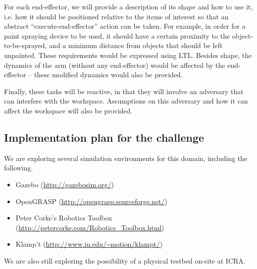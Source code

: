 \documentclass{amsart}
\theoremstyle{definition}
\begin{document}
For each end-effector, we will provide a description of its shape and how to use
it, i.e.  how it should be positioned relative to the items of interest so that
an abstract ``execute-end-effector'' action can be taken. For example, in order
for a paint spraying device to be used, it should have a certain proximity to
the object-to-be-sprayed, and a minimum distance from objects that should be
left unpainted. These requirements would be expressed using LTL. Besides shape,
the dynamics of the arm (without any end-effector) would be affected by the
end-effector -- these modified dynamics would also be provided.

Finally, these tasks will be reactive, in that they will involve an adversary
that can interfere with the workspace. Assumptions on this adversary and how it
can affect the workspace will also be provided.

\subsection{Implementation plan for the challenge}

We are exploring several simulation environments for this domain, including the following.
\begin{itemize}
\item Gazebo (\url{http://gazebosim.org/})
\item OpenGRASP (\url{http://opengrasp.sourceforge.net/})
\item Peter Corke's Robotics Toolbox
(\url{http://petercorke.com/Robotics_Toolbox.html})
\item Klamp't (\url{http://www.iu.edu/~motion/klampt/})
\end{itemize}

We are also still exploring the possibility of a physical testbed on-site at ICRA.




\end{document}
